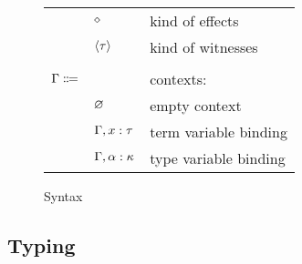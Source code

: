 \begin{figure}[H]
\begin{center}
\begin{tabular}{l l l}
          & $\diamond$ & kind of effects \\
          & $\left\langle \tau \right\rangle$ & kind of witnesses \\
          \\
          $\Gamma \Coloneqq$ & & contexts: \\
          & $\varnothing$ & empty context \\
          & $\Gamma, x : \tau$ & term variable binding \\
          & $\Gamma, \alpha : \kappa$ & type variable binding \\
        \end{tabular}
      \end{center}

      \caption{Syntax}
      \label{fig:syntax}
    \end{figure}

  \subsection{Typing}


